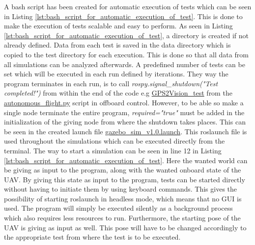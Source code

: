 \documentclass[../Head/report.tex]{subfiles}
\begin{document}
A bash script has been created for automatic execution of tests which can be seen in Listing \ref{lst:bash_script_for_automatic_execution_of_test}. This is done to make the execution of tests scalable and easy to perform. As seen in Listing \ref{lst:bash_script_for_automatic_execution_of_test}, a directory is created if not already defined. Data from each test is saved in the data directory which is copied to the test directory for each execution. This is done so that all data from all simulations can be analyzed afterwards. A predefined number of tests can be set which will be executed in each run defined by iterations. They way the program terminates in each run, is to call \textit{rospy.signal\_shutdown("Test completed!")} from within the end of the code e.g \href{https://github.com/Kenil16/master\_project/blob/0ca6b6205ecfd8cc6a819d7cd30c979fcd39e6e8/software/ros\_workspace/src/offboard\_control/autonomous\_flight.py#L266}{GPS2Vision\_test} from the \href{https://github.com/Kenil16/master\_project/blob/master/software/ros\_workspace/src/offboard\_control/autonomous\_flight.py}{autonomous\_flight.py} script in offboard control. However, to be able so make a single node terminate the entire program, \textit{required="true"} must be added in the initialization of the giving node from where the shutdown takes places. This can be seen in the created launch file \href{https://github.com/Kenil16/master\_project/blob/0ca6b6205ecfd8cc6a819d7cd30c979fcd39e6e8/software/ros\_workspace/PX4-software/launch/gazebo\_sim\_v1.0.launch#L63}{gazebo\_sim\_v1.0.launch}. This roslaunch file is used throughout the simulations which can be executed directly from the terminal. The way to start a simulation can be seen in line 12 in Listing \ref{lst:bash_script_for_automatic_execution_of_test}. Here the wanted world can be giving as input to the program, along with the wanted onboard state of the UAV. By giving this state as input to the program, tests can be started directly without having to initiate them by using keyboard commands. This gives the possibility of starting roslaunch in headless mode, which means that no GUI is used. The program will simply be executed silently as a background process which also requires less resources to run. Furthermore, the starting pose of the UAV is giving as input as well. This pose will have to be changed accordingly to the appropriate test from where the test is to be executed. 
\end{document}

